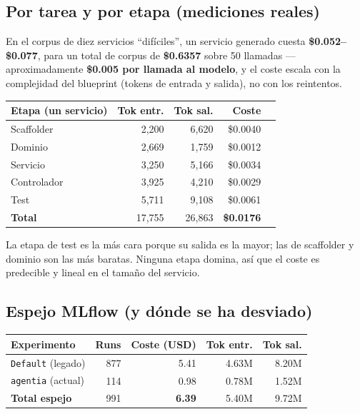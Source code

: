 \documentclass[11pt,a4paper]{article}
\begin{document}
\subsection{Por tarea y por etapa (mediciones reales)}

En el corpus de diez servicios ``difíciles'', un servicio generado cuesta
\textbf{\$0.052--\$0.077}, para un total de corpus de \textbf{\$0.6357} sobre 50
llamadas --- aproximadamente \textbf{\$0.005 por llamada al modelo}, y el coste escala
con la complejidad del blueprint (tokens de entrada y salida), no con los reintentos.

\begin{center}
\begin{tabular}{@{}lrrrr@{}}
\toprule
\textbf{Etapa (un servicio)} & \textbf{Tok entr.} & \textbf{Tok sal.} & \textbf{Coste} \\
\midrule
Scaffolder & 2{,}200 & 6{,}620 & \$0.0040 \\
Dominio & 2{,}669 & 1{,}759 & \$0.0012 \\
Servicio & 3{,}250 & 5{,}166 & \$0.0034 \\
Controlador & 3{,}925 & 4{,}210 & \$0.0029 \\
Test & 5{,}711 & 9{,}108 & \$0.0061 \\
\midrule
\textbf{Total} & 17{,}755 & 26{,}863 & \textbf{\$0.0176} \\
\bottomrule
\end{tabular}
\end{center}

La etapa de test es la más cara porque su salida es la mayor; las de scaffolder y
dominio son las más baratas. Ninguna etapa domina, así que el coste es predecible y
lineal en el tamaño del servicio.

\subsection{Espejo MLflow (y dónde se ha desviado)}

\begin{center}
\begin{tabular}{@{}lrrrr@{}}
\toprule
\textbf{Experimento} & \textbf{Runs} & \textbf{Coste (USD)} & \textbf{Tok entr.} & \textbf{Tok sal.} \\
\midrule
\texttt{Default} (legado) & 877 & 5.41 & 4.63M & 8.20M \\
\texttt{agentia} (actual) & 114 & 0.98 & 0.78M & 1.52M \\
\midrule
\textbf{Total espejo} & 991 & \textbf{6.39} & 5.40M & 9.72M \\
\bottomrule
\end{tabular}
\end{center}
\end{document}
